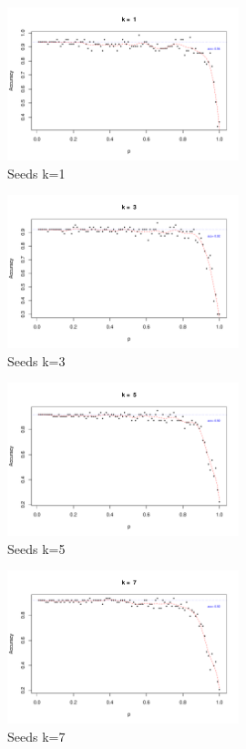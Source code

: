 \documentclass{article}
\begin{document}
\begin{figure}[h!]
 \centering
 \includegraphics[width=0.6\textwidth]{./figures/Seeds_k1.pdf}
 \caption{Seeds k=1}
 \label{fig:Seeds1}
\end{figure}
\begin{figure}[h!]
 \centering
 \includegraphics[width=0.6\textwidth]{./figures/Seeds_k3.pdf}
 \caption{Seeds k=3}
 \label{fig:Seeds3}
\end{figure}
\begin{figure}
 \centering
 \includegraphics[width=0.6\textwidth]{./figures/Seeds_k5.pdf}
 \caption{Seeds k=5}
 \label{fig:Seeds5}
\end{figure}
\begin{figure}
 \centering
 \includegraphics[width=0.6\textwidth]{./figures/Seeds_k7.pdf}
 \caption{Seeds k=7}
 \label{fig:Seeds7}
\end{figure}
\end{document}

